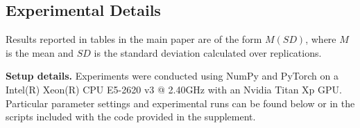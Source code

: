 \subsection{Experimental Details}
 Results reported in tables in the main paper are of the form $M\scriptscriptstyle{(SD)}$, where $M$ is the mean and $SD$ is the standard deviation calculated over replications.

{\bf Setup details.} Experiments were conducted using NumPy and PyTorch on a Intel(R) Xeon(R) CPU E5-2620 v3 @ 2.40GHz with an Nvidia Titan Xp GPU. Particular parameter settings and experimental runs can be found below or in the scripts included with the code provided in the supplement.

